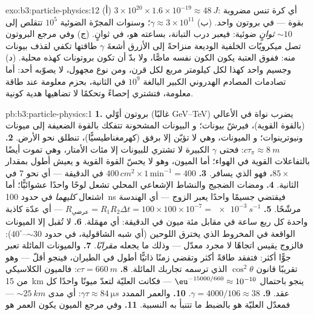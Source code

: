 \begin{solution}{exo:b3:particle-physics:12}
(أ) $3\times10^{20}\times1.6\times10^{-19} \approx \qty{48}{J}$:
أي كرة تنس مضروبة بقوة --- في بروتون واحد. (ب) $\gamma \approx
3\times10^{11}$؛ وسنوات المجرّة الضوئية $10^{5}$ تتقلص إلى
${\sim}10$ \emph{ثوانٍ} ضوئية: فيعبر درب التبانة، بساعته
هو، في ثوانٍ. (ج) وفي مرجع البروتون تصل ميكرويّات
الخلفية الوديعة منزاحةً إلى الأزرق أشعةَ $\gamma$ طاقتها
تكفي لقذف بيونات منه: ففوق العتبة يكون الكون
نفسه ماصًّا، ولا بدّ أن تكون بروتونات كهذه محلية. (د) وجسيم
واحد كهذا لكل كيلومتر مربع لكل قرن، ومن نوع مجهول،
لا يصوّبه أحد: أما تصادمات المصادم الهدروني الكبير البالغة $10^{9}$ في
الثانية، بحزم معلومة عند طاقة معلومة، فتشتري إحصاءً
وتحكمًا لا تضاهيها هدية كونية.
\end{solution}

\begin{solution}{pb:b3:particle-physics:1}
\textbf{1.} بروتون أوّلي (غالبًا \unit{GeV}--\unit{TeV})
يضرب نواة في الأعالي (بالقوة القوية)، فيرشّ بيونات؛ و
البيونات المشحونة تتفكك بالقوة الضعيفة إلى ميونات ونيوترينوات؛ و
الميونات، وهي لا تؤيّن إلا برفق (كهرمغناطيسيًّا)، تنطلق نحو
الأرض.
\textbf{2.} $c\tau_\pi \approx \qty{8}{m}$: فحتى $\gamma$ الكبيرة
لا تشتري للبيونات إلا مئات الأمتار، وهي تموت أيضًا بالتفاعلات
القوية في الهواء؛ أما الميون، وهو لا يحسّ القوة القوية و
يعيش أطول بمقدار $85\times$، فهو الذي يسافر.
\textbf{3.} $400\,\unit{cm^2}\times1\,\text{min}^{-1} = 400$
في الدقيقة --- أي نحو 7 في الثانية.
\textbf{4.} ومضات الضجيج والنشاط الإشعاعي المحلي تشعل لوحًا
واحدًا عشوائيًّا؛ أما اشتعال \emph{كليهما} في حدود \qty{100}{ns}
فيقتضي جسيمًا واحدًا يعبر الزوج --- أي الهندسة
مرشّحًا.
\textbf{5.} $R_{\text{عرضي}} = R_1R_2\Delta t = 100\times100
\times10^{-7} = \qty{e-3}{s^{-1}}$ --- أي عدّة كاذبة واحدة كل
ربع ساعة في مقابل مئة ميون في الدقيقة: أي مهمَلة.
\textbf{6.} لا تُقبل إلا الميونات الواقعة في المخروط الذي يخترق
اللوحين (أي شبه الشاقولية، في حدود ${\sim}30$--$40^\circ$):
فالزوج يقيس اتجاهًا لا مجرد معدّل ---
وذلك ما يجعله \emph{مقرابًا}.
\textbf{7.} والميونات المائلة تعبر جوًّا أكثر: فتفقد طاقةً أكثر
وتقضي زمنًا ذاتيًّا أطول في الطيران، فينجو أقلّ ---
وهو تقريبًا قانون $\cos^2\theta$ الذي ترسمه تجاربك المائلة.
\textbf{8.} $c\tau = \qty{660}{m}$: فالميون الكلاسيكي من
\qty{15}{km} ينجو باحتمال
$\eu^{-15000/660} \approx 10^{-10}$ --- فكانت العليّة لتعدّ
ميونًا واحدًا كل عقد.
\textbf{9.} $\gamma = 4000/106 \approx 38$.
\textbf{10.} والعمر الممدد $\gamma\tau \approx
\qty{84}{\micro s}$: أي مدى ${\sim}\qty{25}{km}$ --- فمعدّل العليّة
هو بالضبط ما تتنبأ به النسبية.
\textbf{11.} وفي مرجع الميون يكون العمر هو

\end{solution}
